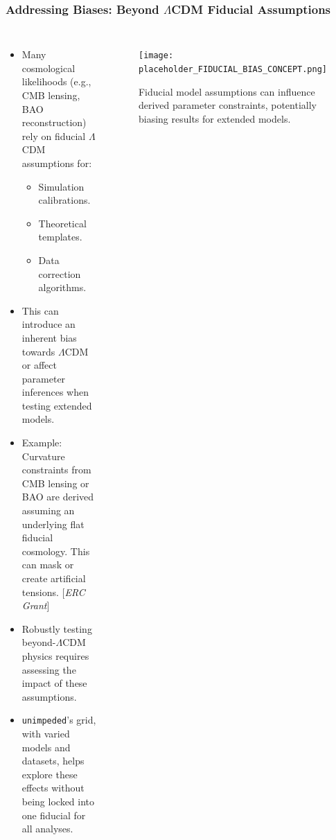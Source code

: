 \documentclass[aspectratio=169]{beamer}
\begin{document}
\begin{frame}
    \frametitle{Addressing Biases: Beyond $\Lambda$CDM Fiducial Assumptions}
    \begin{columns}[T]
        \begin{itemize}
            \item Many cosmological likelihoods (e.g., CMB lensing, BAO reconstruction) rely on fiducial $\Lambda$CDM assumptions for:
                \begin{itemize}
                    \item Simulation calibrations.
                    \item Theoretical templates.
                    \item Data correction algorithms.
                \end{itemize}
            \item This can introduce an inherent bias towards $\Lambda$CDM or affect parameter inferences when testing extended models.
            \item Example: Curvature constraints from CMB lensing or BAO are derived assuming an underlying flat fiducial cosmology. This can mask or create artificial tensions. [\textit{ERC Grant}]
            \item Robustly testing beyond-$\Lambda$CDM physics requires assessing the impact of these assumptions.
            \item \texttt{unimpeded}'s grid, with varied models and datasets, helps explore these effects without being locked into one fiducial for all analyses.
        \end{itemize}
        \begin{figure}
            \centering
            \texttt{[image: placeholder\_FIDUCIAL\_BIAS\_CONCEPT.png]}
            \caption{Fiducial model assumptions can influence derived parameter constraints, potentially biasing results for extended models.}
        \end{figure}
    \end{columns}
\end{frame}
\end{document}
